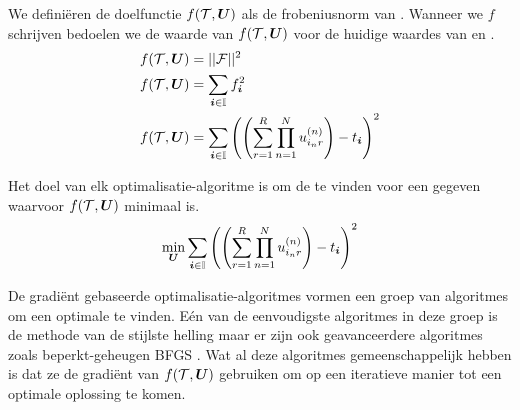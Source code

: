 We defini\"eren de doelfunctie $f(\mathcal{T}, \boldsymbol{U})$ als de frobeniusnorm van \FF{}. Wanneer we $f$ schrijven bedoelen we %
de waarde van $f(\mathcal{T}, \boldsymbol{U})$ voor de huidige waardes van \TT{} en \UUU{}.
\begin{align*}
    f(\mathcal{T}, \boldsymbol{U}) &= ||\mathcal{F}||^2\\
    f(\mathcal{T}, \boldsymbol{U}) &= \sum_{\boldsymbol{i}{} \in \mathbb{I}} f_{\boldsymbol{i}{}}^2\\
    f(\mathcal{T}, \boldsymbol{U}) &=  \sum_{\boldsymbol{i}{} \in \mathbb{I}} \left( \left( \sum_{r=1}^{R} \prod_{n=1}^{N} u^{(n)}_{i_{n}r} \right) - t_{\boldsymbol{i}{}} \right)^2
\end{align*}

Het doel van elk optimalisatie-algoritme is om de \UUU{} te vinden voor een gegeven \TT{} waarvoor $f(\mathcal{T}, \boldsymbol{U})$ minimaal is.
\[
    \min_{\boldsymbol{U}} \sum_{\boldsymbol{i}{} \in \mathbb{I}} \left( \left( \sum_{r=1}^{R} \prod_{n=1}^{N} u^{(n)}_{i_{n}r} \right) - t_{\boldsymbol{i}{}} \right)^2
\]

De gradi\"ent gebaseerde optimalisatie-algoritmes vormen een groep van algoritmes om een optimale \UUU{} te vinden. E\'en van de eenvoudigste algoritmes in deze groep is de methode van de stijlste helling maar er zijn ook geavanceerdere algoritmes zoals beperkt-geheugen BFGS \cite{bfgs}. Wat al deze algoritmes gemeenschappelijk hebben is dat ze de gradi\"ent van $f(\mathcal{T}, \boldsymbol{U})$ gebruiken om op een iteratieve manier tot een optimale oplossing te komen.

